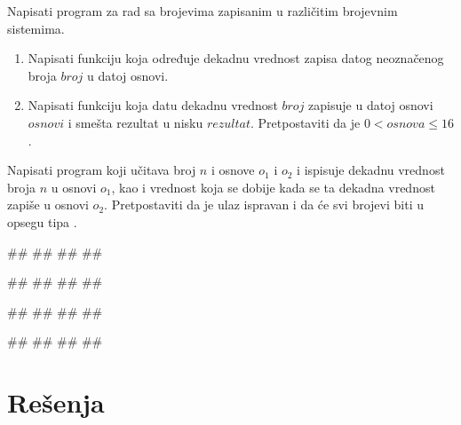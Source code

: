 \begin{Exercise}[difficulty=1, label=NIS_31] 
Napisati program za rad sa brojevima zapisanim u različitim brojevnim sistemima.
\begin{enumerate}
\setlength\itemsep{0em}
\item Napisati funkciju  koja
određuje dekadnu vrednost zapisa datog neoznačenog broja $broj$ u datoj osnovi. 
\item Napisati funkciju  
koja datu dekadnu vrednost $broj$ zapisuje u datoj osnovi $osnovi$ i smešta rezultat u nisku $rezultat$. 
Pretpostaviti da je $0 < osnova \leq 16$.  
\end{enumerate}

Napisati program koji učitava broj $n$ i osnove $o_1$ i $o_2$ i ispisuje dekadnu vrednost broja $n$ u osnovi $o_1$, kao i
vrednost koja se dobije kada se ta dekadna vrednost zapiše u osnovi $o_2$.
Pretpostaviti da je ulaz ispravan i da će svi brojevi biti u opsegu tipa . 

\begin{miditest}
\begin{upotreba}{1}
#\naslovInt#
##
##
##
\end{upotreba}
\end{miditest}
\begin{miditest}
\begin{upotreba}{2}
#\naslovInt#
##
##
##
\end{upotreba}
\end{miditest}

\begin{miditest}
\begin{upotreba}{3}
#\naslovInt#
##
##
##
\end{upotreba}
\end{miditest}
\begin{miditest}
\begin{upotreba}{4}
#\naslovInt#
##
##
##
\end{upotreba}
\end{miditest}
\end{Exercise}
\ifresenja
\begin{Answer}[ref=NIS_31]
\end{Answer}
\fi

\ifresenja
\section{Rešenja}
\shipoutAnswer
\fi

